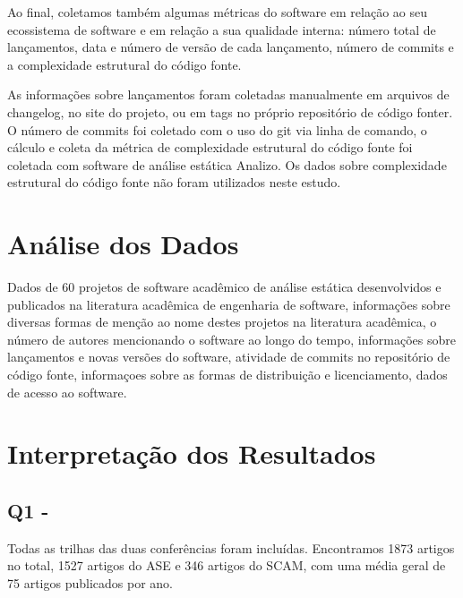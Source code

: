 Ao final, coletamos também algumas métricas do software em relação ao seu
ecossistema de software e em relação a sua qualidade interna: número
total de lançamentos, data e número de versão de cada lançamento, número de
commits e a complexidade estrutural do código fonte.

As informações sobre lançamentos foram coletadas manualmente em arquivos de
changelog, no site do projeto, ou em tags no próprio repositório de código
fonter. O número de commits foi coletado com o uso do git via linha de comando,
o cálculo e coleta da métrica de complexidade estrutural do código fonte foi
coletada com software de análise estática Analizo.
Os dados sobre complexidade estrutural do código fonte não foram utilizados
neste estudo.

\section{Análise dos Dados} %
\label{sec:study1:analysis}

Dados de 60 projetos de software acadêmico de análise estática desenvolvidos e
publicados na literatura acadêmica de engenharia de software, informações sobre
diversas formas de menção ao nome destes projetos na literatura acadêmica,
o número de autores mencionando o software ao longo do tempo, informações sobre
lançamentos e novas versões do software, atividade de commits no repositório
de código fonte, informaçoes sobre as formas de distribuição e licenciamento,
dados de acesso ao software.

\section{Interpretação dos Resultados} %
\label{sec:study1:interpretation}


\subsection{Q1 - \EstudoDoisQuestaoUm}

Todas as trilhas das duas conferências foram incluídas. 
Encontramos 1873 artigos no total, 1527 artigos do ASE e 346
artigos do SCAM, 
com uma média geral de 75 artigos publicados por ano. 

